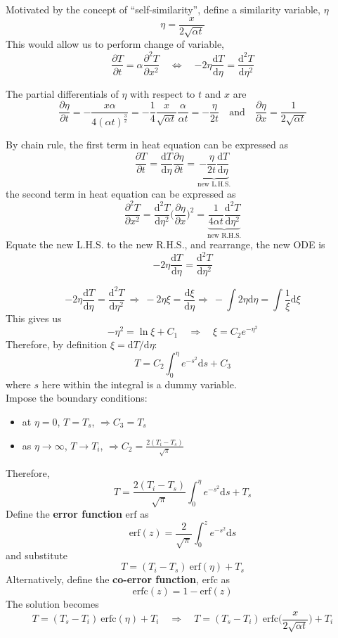 \documentclass[12pt, a4paper]{article}
\numberwithin{equation}{subsection}
\begin{document}
Motivated by the concept of ``self-similarity'', define a similarity variable, $\eta$
\[
    \eta = \frac{x}{2\sqrt{\alpha t}}
\]
This would allow us to perform change of variable,
\[
    \frac{\partial T}{\partial t} = \alpha \frac{\partial^2 T}{\partial x^2} \quad \Leftrightarrow \quad \boxed{-2\eta \frac{\mathrm{d}T}{\mathrm{d}\eta} = \frac{\mathrm{d}^{2}T}{\mathrm{d}\eta^{2}}}
\]
\begin{tcolorbox}[title = \textbf{Derivation}]
The partial differentials of $\eta$ with respect to $t$ and $x$ are
\[
    \frac{\partial \eta}{\partial t} 
    = -\frac{x\alpha}{4(\alpha t)^{\frac{3}{2}}} 
    = -\frac{1}{4} \frac{x}{\sqrt{\alpha t}}\frac{\alpha}{\alpha t}
    = -\frac{\eta}{2t}
    \quad \text{and} \quad
    \frac{\partial \eta}{\partial x} = \frac{1}{2\sqrt{\alpha t}}
\]

By chain rule, the first term in heat equation can be expressed as
    \[
        \frac{\partial T}{\partial t} = \frac{\mathrm{d}T}{\mathrm{d}\eta} \frac{\partial \eta}{\partial t} = \underbrace{-\frac{\eta}{2t} \frac{\mathrm{d}T}{\mathrm{d}\eta}}_{\text{new L.H.S.}}
    \]
the second term in heat equation can be expressed as
\[
    \frac{\partial^2 T}{\partial x^2} = \frac{\mathrm{d}^2 T}{\mathrm{d} \eta^2} \bigg( \frac{\partial \eta}{\partial x} \bigg)^2 = \underbrace{\frac{1}{4 \alpha t} \frac{\mathrm{d}^2 T}{\mathrm{d} \eta^2}}_{\text{new R.H.S.}}
\]
Equate the new L.H.S. to the new R.H.S., and rearrange, the new ODE is
\[
    -2\eta \frac{\mathrm{d}T}{\mathrm{d}\eta} = \frac{\mathrm{d}^{2}T}{\mathrm{d}\eta^{2}}
\]
\end{tcolorbox}

\[
    -2\eta \frac{\mathrm{d}T}{\mathrm{d}\eta} = \frac{\mathrm{d}^{2}T}{\mathrm{d}\eta^{2}} \ \Rightarrow \ -2 \eta \xi = \frac{\mathrm{d}\xi}{\mathrm{d}\eta} \Rightarrow \ -\int 2\eta \mathrm{d}\eta = \int \frac{1}{\xi} \mathrm{d}\xi
\]
This gives us
\[
    -\eta^2 = \ln\xi + C_1 \quad \Rightarrow \quad \xi = C_2 e^{-\eta^2}
\]
Therefore, by definition $\xi = \mathrm{d}T/\mathrm{d}\eta$:
\[
    T = C_2 \int_{0}^{\eta} e^{-s^2} \mathrm{d}s + C_3
\]
where $s$ here within the integral is a dummy variable.\\

Impose the boundary conditions:
\begin{itemize}
    \item at $\eta = 0$, $T = T_s$, $\Rightarrow C_3 = T_s$
    \item as $\eta \to \infty$, $T \to T_i$, $\Rightarrow C_2 = \frac{2(T_i - T_s)}{\sqrt{\pi}}$
\end{itemize}
Therefore, 
\[
    T =  \frac{2(T_i - T_s)}{\sqrt{\pi}} \int_{0}^{\eta} e^{-s^2} \mathrm{d}s + T_s
\]
Define the \textbf{error function} $\mathrm{erf}$ as
\[
    \mathrm{erf}(z) = \frac{2}{\sqrt{\pi}} \int_{0}^{z} e^{-s^2} \mathrm{d}s
\]
and substitute
\[
    T = (T_i - T_s) \ \mathrm{erf}(\eta) + T_s
\]
Alternatively, define the \textbf{co-error function}, $\mathrm{erfc}$ as 
\[
    \mathrm{erfc}(z) = 1 - \mathrm{erf}(z)
\]
The solution becomes 
\[
    T = (T_s - T_i) \ \mathrm{erfc}(\eta) + T_i \quad \Rightarrow \quad \boxed{T = (T_s - T_i) \ \mathrm{erfc}\bigg(\frac{x}{2\sqrt{\alpha t}}\bigg) + T_i}
\]
\end{document}
